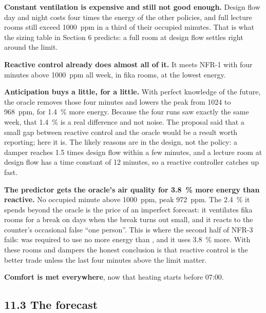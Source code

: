 \textbf{Constant ventilation is expensive and still not good enough.} Design
flow day and night costs four times the energy of the other policies, and full
lecture rooms still exceed 1000~ppm in a third of their occupied minutes. That
is what the sizing table in Section 6 predicts: a full room at design flow
settles right around the limit.

\textbf{Reactive control already does almost all of it.} It meets NFR-1 with
four minutes above 1000~ppm all week, in fika rooms, at the lowest energy.

\textbf{Anticipation buys a little, for a little.} With perfect knowledge of
the future, the oracle removes those four minutes and lowers the peak from
1024 to 968~ppm, for 1.4~\% more energy. Because the four runs saw exactly the
same week, that 1.4~\% is a real difference and not noise. The proposal said
that a small gap between reactive control and the oracle would be a result
worth reporting; here it is. The likely reasons are in the design, not the
policy: a damper reaches 1.5 times design flow within a few minutes, and a
lecture room at design flow has a time constant of 12 minutes, so a reactive
controller catches up fast.

\textbf{The predictor gets the oracle's air quality for 3.8~\% more energy
than reactive.} No occupied minute above 1000~ppm, peak 972~ppm. The 2.4~\% it
spends beyond the oracle is the price of an imperfect forecast: it ventilates
fika rooms for a break on days when the break turns out small, and it reacts
to the counter's occasional false ``one person''. This is where the second
half of NFR-3 fails:  was required to use no more energy than
, and it uses 3.8~\% more. With these rooms and dampers the
honest conclusion is that reactive control is the better trade unless the last
four minutes above the limit matter.

\textbf{Comfort is met everywhere}, now that heating starts before 07:00.


\subsection{11.3 The forecast}


